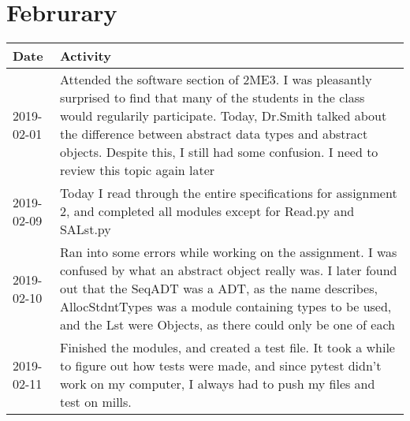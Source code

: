 \documentclass[12pt]{article}
\begin{document}
\section{Februrary}


 \begin{tabular}{|p{2cm}| p{12cm}|} 
 \hline
 Date & Activity  \\ 
 \hline
   2019-02-01 & Attended the software section of 2ME3. I was pleasantly surprised to find that many of the students in the class would regularily participate. Today, Dr.Smith talked about the difference between abstract data types and abstract objects. Despite this, I still had some confusion. I need to review this topic again later \\
 \hline
   2019-02-09 & Today I read through the entire specifications for assignment 2, and completed all modules except for Read.py and SALst.py \\
 \hline
    2019-02-10 & Ran into some errors while working on the assignment. I was confused by what an abstract object really was. I later found out that the SeqADT was a ADT, as the name describes, AllocStdntTypes was a module containing types to be used, and the Lst were Objects, as there could only be one of each \\
 \hline
   2019-02-11 & Finished the modules, and created a test file. It took a while to figure out how tests were made, and since pytest didn't work on my computer, I always had to push my files and test on mills. \\
 \hline
 
\end{tabular}
\end{document}
